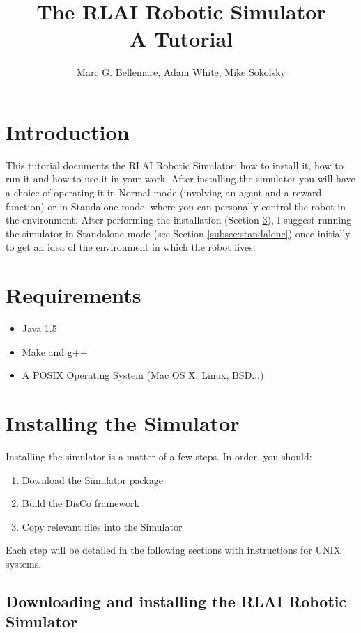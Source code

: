 \documentclass[12pt]{article}
\author{Marc G. Bellemare, Adam White, Mike Sokolsky}
\title{The RLAI Robotic Simulator\\ A Tutorial}
\begin{document}
\maketitle

\section{Introduction}

This tutorial documents the RLAI Robotic Simulator: how to install it, how
to run it and how to use it in your work. After installing the simulator
you will have a choice of operating it in Normal mode (involving an agent
and a reward function) or in Standalone mode, where you can personally 
control the robot in the environment. After performing the installation
(Section \ref{sec:installation}),  I suggest running the simulator in 
Standalone mode (see Section \ref{subsec:standalone}) once initially to get
an idea of the environment in which the robot lives. 

\section{Requirements}

\begin{itemize}
\item{Java 1.5}
\item{Make and g++}
\item{A POSIX Operating System (Mac OS X, Linux, BSD...)}
\end{itemize}

\section{Installing the Simulator}\label{sec:installation}

Installing the simulator is a matter of a few steps. In order, you should:

\begin{enumerate}
\item{Download the Simulator package}
\item{Build the DisCo framework}
\item{Copy relevant files into the Simulator}
\end{enumerate}

Each step will be detailed in the following sections with instructions for
UNIX systems.

\subsection{Downloading and installing the RLAI Robotic Simulator}
\end{document}
